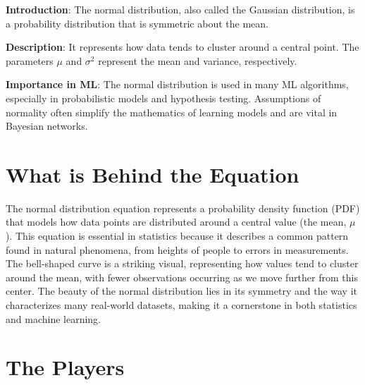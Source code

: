 \documentclass[
  12 pt,
  a4paper,
]{book}
\numberwithin{equation}{section}
\theoremstyle{plain}      %
\theoremstyle{definition} %
\theoremstyle{remark}     %
\theoremstyle{note}         %
\begin{document}
\textbf{Introduction}: The normal distribution, also called the Gaussian
distribution, is a probability distribution that is symmetric about the
mean.

\textbf{Description}: It represents how data tends to cluster around a
central point. The parameters \(\mu\) and \(\sigma^2\) represent the
mean and variance, respectively.

\textbf{Importance in ML}: The normal distribution is used in many ML
algorithms, especially in probabilistic models and hypothesis testing.
Assumptions of normality often simplify the mathematics of learning
models and are vital in Bayesian networks.

\vspace*{\fill}

\newpage

\hypertarget{what-is-behind-the-equation-1}{%
\section{What is Behind the
Equation}\label{what-is-behind-the-equation-1}}

The normal distribution equation represents a probability density
function (PDF) that models how data points are distributed around a
central value (the mean, \(\mu\)). This equation is essential in
statistics because it describes a common pattern found in natural
phenomena, from heights of people to errors in measurements. The
bell-shaped curve is a striking visual, representing how values tend to
cluster around the mean, with fewer observations occurring as we move
further from this center. The beauty of the normal distribution lies in
its symmetry and the way it characterizes many real-world datasets,
making it a cornerstone in both statistics and machine learning.

\newpage

\hypertarget{the-players}{%
\section{The Players}\label{the-players}}
\end{document}
